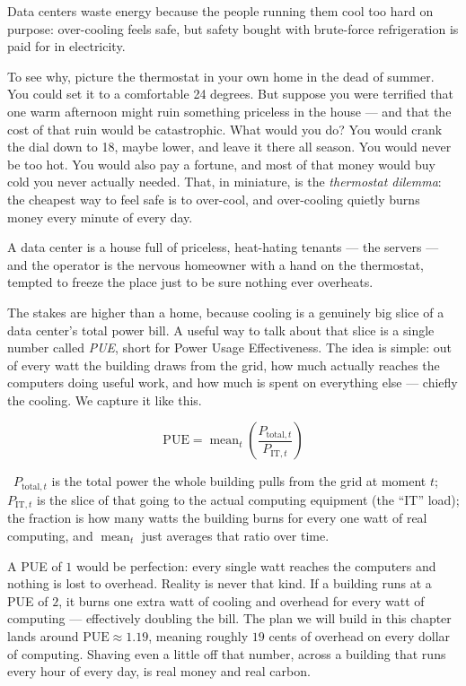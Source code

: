 \documentclass[11pt]{report}
\newcommand{\plainwords}[1]{\par\smallskip\noindent{\itshape In plain words.}~#1\par\smallskip}
\begin{document}
\begin{keyidea}
Data centers waste energy because the people running them cool too hard on purpose: over-cooling feels safe, but safety bought with brute-force refrigeration is paid for in electricity.
\end{keyidea}

To see why, picture the thermostat in your own home in the dead of summer. You could set it to a comfortable 24 degrees. But suppose you were terrified that one warm afternoon might ruin something priceless in the house --- and that the cost of that ruin would be catastrophic. What would you do? You would crank the dial down to 18, maybe lower, and leave it there all season. You would never be too hot. You would also pay a fortune, and most of that money would buy cold you never actually needed. That, in miniature, is the \emph{thermostat dilemma}: the cheapest way to feel safe is to over-cool, and over-cooling quietly burns money every minute of every day.

\begin{analogy}
A data center is a house full of priceless, heat-hating tenants --- the servers --- and the operator is the nervous homeowner with a hand on the thermostat, tempted to freeze the place just to be sure nothing ever overheats.
\end{analogy}

The stakes are higher than a home, because cooling is a genuinely big slice of a data center's total power bill. A useful way to talk about that slice is a single number called \emph{PUE}, short for Power Usage Effectiveness. The idea is simple: out of every watt the building draws from the grid, how much actually reaches the computers doing useful work, and how much is spent on everything else --- chiefly the cooling. We capture it like this.

\begin{equation}\label{eq:pue}
\mathrm{PUE} = \operatorname{mean}_t \left( \frac{P_{\text{total},t}}{P_{\text{IT},t}} \right)
\end{equation}
\plainwords{$P_{\text{total},t}$ is the total power the whole building pulls from the grid at moment $t$; $P_{\text{IT},t}$ is the slice of that going to the actual computing equipment (the ``IT'' load); the fraction is how many watts the building burns for every one watt of real computing, and $\operatorname{mean}_t$ just averages that ratio over time.}

A PUE of $1$ would be perfection: every single watt reaches the computers and nothing is lost to overhead. Reality is never that kind. If a building runs at a PUE of $2$, it burns one extra watt of cooling and overhead for every watt of computing --- effectively doubling the bill. The plan we will build in this chapter lands around $\mathrm{PUE} \approx 1.19$, meaning roughly $19$ cents of overhead on every dollar of computing. Shaving even a little off that number, across a building that runs every hour of every day, is real money and real carbon.
\end{document}
